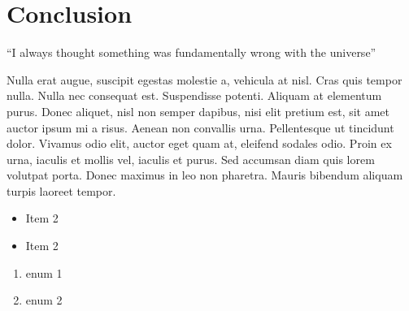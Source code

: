 \documentclass[../main.tex]{subfiles}
\begin{document}
\section{Conclusion}
``I always thought something was fundamentally wrong with the universe'' \citep{adams1995hitchhiker}

Nulla erat augue, suscipit egestas molestie a, vehicula at nisl. Cras quis tempor nulla. Nulla nec consequat est. Suspendisse potenti. Aliquam at elementum purus. Donec aliquet, nisl non semper dapibus, nisi elit pretium est, sit amet auctor ipsum mi a risus. Aenean non convallis urna. Pellentesque ut tincidunt dolor. Vivamus odio elit, auctor eget quam at, eleifend sodales odio. Proin ex urna, iaculis et mollis vel, iaculis et purus. Sed accumsan diam quis lorem volutpat porta. Donec maximus in leo non pharetra. Mauris bibendum aliquam turpis laoreet tempor.
\begin{itemize}
    \item Item 2
    \item Item 2
\end{itemize}
\begin{enumerate}
    \item enum 1
    \item enum 2
\end{enumerate}
\end{document}
